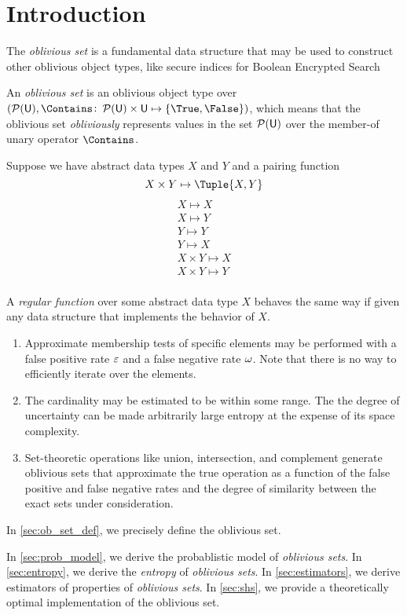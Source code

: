 \documentclass[ ../main.tex]{subfiles}
\begin{document}
\section{Introduction}
The \emph{oblivious set}\cite{oset} is a fundamental data structure that may be used to construct other oblivious object types, like secure indices for Boolean Encrypted Search\cite{sibool}

An \emph{oblivious set} is an oblivious object type over 
$(\PowerSet(\Set{U}),\Contains \colon \PowerSet(\Set{U}) \times \Set{U} \mapsto 
\{\True,\False\})$, which means that the oblivious set \emph{obliviously} 
represents values in the set $\PowerSet(\Set{U})$ over the member-of unary 
operator $\Contains$.

Suppose we have abstract data types $X$ and $Y$ and a pairing function
\begin{equation}
    X \times Y \mapsto \Tuple{X,Y}
\end{equation}
\begin{align}
    X \mapsto X\\
    X \mapsto Y\\
    Y \mapsto Y\\
    Y \mapsto X\\
    X \times Y \mapsto X\\
    X \times Y \mapsto Y\\
\end{align}




A \emph{regular function} over some abstract data type $X$ behaves the same way 
if given any data structure that implements the behavior of $X$. 

\begin{enumerate}
    \item Approximate membership tests of specific elements may be performed with a false positive rate $\varepsilon$ and a false negative rate $\omega$. Note that there is no way to efficiently iterate over the elements.
    
    \item The cardinality may be estimated to be within some range. The the degree of uncertainty can be made arbitrarily large entropy at the expense of its space complexity.
        
    \item Set-theoretic operations like union, intersection, and complement generate oblivious sets that approximate the true operation as a function of the false positive and false negative rates and the degree of similarity between the exact sets under consideration.
\end{enumerate}

In \cref{sec:ob_set_def}, we precisely define the oblivious set.


In \cref{sec:prob_model}, we derive the probablistic model of \emph{oblivious sets}. In \cref{sec:entropy}, we derive the \emph{entropy} of \emph{oblivious sets}. In \cref{sec:estimators}, we derive estimators of properties of \emph{oblivious sets}. In \cref{sec:shs}, we provide a theoretically optimal implementation of the oblivious set.
\end{document}
